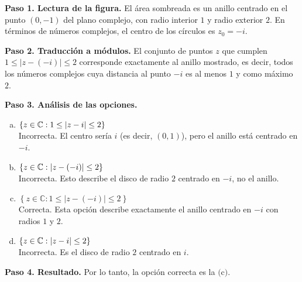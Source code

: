 \begin{prob}
\begin{myproof}
\textbf{Paso 1. Lectura de la figura.} El área sombreada es un anillo centrado en el punto $(0,-1)$ del plano complejo, con radio interior $1$ y radio exterior $2$. En términos de números complejos, el centro de los círculos es $z_0 = -i$.

\textbf{Paso 2. Traducción a módulos.} El conjunto de puntos $z$ que cumplen $1 \leq |z-(-i)| \leq 2$ corresponde exactamente al anillo mostrado, es decir, todos los números complejos cuya distancia al punto $-i$ es al menos $1$ y como máximo $2$.

\textbf{Paso 3. Análisis de las opciones.}

\begin{enumerate}[(a)]
\item $\left\lbrace z\in \mathbb{C}: 1\leq\left\vert z-i\right\vert\leq 2 \right\rbrace$\\
Incorrecta. El centro sería $i$ (es decir, $(0,1)$), pero el anillo está centrado en $-i$.

\item $\left\lbrace z\in \mathbb{C}:  \left\vert z-(-i)\right\vert\leq 2 \right\rbrace$\\
Incorrecta. Esto describe el disco de radio $2$ centrado en $-i$, no el anillo.

\item $\left\lbrace z\in\mathbb{C}:1\leq|z-(-i)|\leq 2\right\rbrace$\\
Correcta. Esta opción describe exactamente el anillo centrado en $-i$ con radios $1$ y $2$.

\item $\left\lbrace z\in \mathbb{C}:  \left\vert z-i\right\vert\leq 2 \right\rbrace$\\
Incorrecta. Es el disco de radio $2$ centrado en $i$.
\end{enumerate}

\textbf{Paso 4. Resultado.} Por lo tanto, la opción correcta es la $\boxed{\text{(c)}}$.
\end{myproof}

\end{prob}

